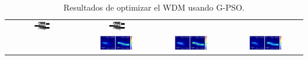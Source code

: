 \begin{landscape}
\begin{table}[ht]
\begin{tabular}{|c|c|c|c|}
      \includegraphics[width=0.24\textwidth]{image/results/wdm/PSO/visualize_eps_disc_512.png} &
      \includegraphics[width=0.24\textwidth]{image/results/wdm/PSO/visualize_eps_fab_512.png} \\
      \cline{2-4}
      &
      \includegraphics[width=0.50\textwidth]{image/results/wdm/PSO/visualize_field_cont_512.png} &
      \includegraphics[width=0.50\textwidth]{image/results/wdm/PSO/visualize_field_disc_512.png} &
      \includegraphics[width=0.50\textwidth]{image/results/wdm/PSO/visualize_field_fab_512.png} \\
    \hline
    \end{tabular}
    \hspace*{-5cm}
    \caption{Resultados de optimizar el WDM usando G-PSO.}
    \label{tab:opt-PSO-wdm}
\end{table}
\end{landscape}

